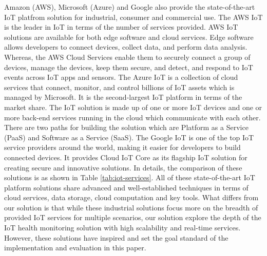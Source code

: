 \documentclass[conference]{IEEEtran}
\begin{document}
Amazon (AWS), Microsoft (Azure) and Google also provide the state-of-the-art IoT platfrom solution for industrial, consumer and commercial use. The AWS IoT is the leader in IoT in terms of the number of services provided. AWS IoT solutions are available for both edge software and cloud services. Edge software allows developers to connect devices, collect data, and perform data analysis. Whereas, the AWS Cloud Services enable them to securely connect a group of devices, manage the devices, keep them secure, and detect, and respond to IoT events across IoT apps and sensors. The Azure IoT is a collection of cloud services that connect, monitor, and control billions of IoT assets which is managed by Microsoft. It is the second-largest IoT platform in terms of the market share. The IoT solution is made up of one or more IoT devices and one or more back-end services running in the cloud which communicate with each other. There are two paths for building the solution which are Platform as a Service (PaaS) and Software as a Service (SaaS). The Google IoT is one of the top IoT service providers around the world, making it easier for developers to build connected devices. It provides Cloud IoT Core as its flagship IoT solution for creating secure and innovative solutions. In details, the comparison of these solutions is as shown in Table \ref{tab:iot-services}. All of these state-of-the-art IoT platform solutions share advanced and well-established techniques in terms of cloud services, data storage, cloud computation and key tools. What differs from our solution is that while these industrial solutions focus more on the breadth of provided IoT services for multiple scenarios, our solution explore the depth of the IoT health monitoring solution with high scalability and real-time services. However, these solutions have inspired and set the goal standard of the implementation and evaluation in this paper.

\end{document}

